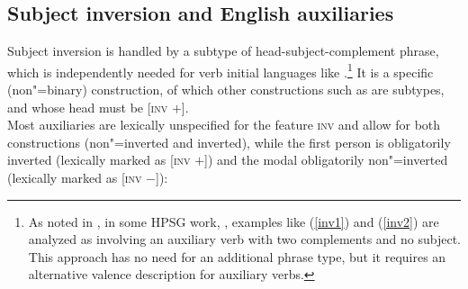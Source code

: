 \eal
\settowidth{}
 \label{inv1}
\label{inv2}
\zl

\subsection{Subject inversion and English auxiliaries}

Subject inversion is handled by a subtype of head-subject-complement phrase, which is independently
needed for verb initial languages like  \parencites[]{Borsley99c-u}[]{SWB2003a}.\footnote{As
  noted in \crossrefchapterw[\page \pageref{page-properties:aux-inversion}]{properties}, in some HPSG work, \eg {},
  examples like (\ref{inv1}) and (\ref{inv2}) are analyzed as involving an auxiliary verb with two
  complements and no subject. This approach has no need for an additional phrase type, but it
  requires an alternative valence description for auxiliary verbs.} It is a specific (non"=binary)
construction, of which other constructions such as  are subtypes,
and whose head must be [\textsc{inv} $+$].
\ea
{} \impl\\
\z
Most auxiliaries are lexically unspecified for the feature \textsc{inv} and allow for both constructions
(non"=inverted and inverted), while the first person  is obligatorily inverted (lexically
marked as [\textsc{inv} $+$]) and the modal  obligatorily non"=inverted (lexically marked
as [\textsc{inv} $-$]):

